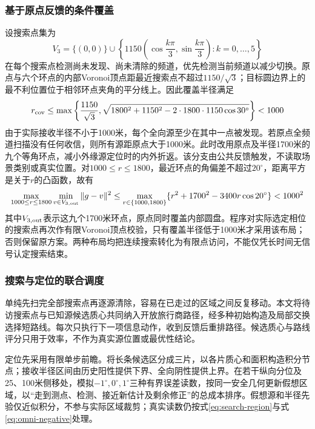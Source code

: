 \subsubsection{基于原点反馈的条件覆盖}
设搜索点集为
\begin{equation}
 V_3=\{(0,0)\}\cup\left\{1150
 \left(\cos\frac{k\pi}{3},\sin\frac{k\pi}{3}\right):k=0,\ldots,5\right\}
 \label{eq:p3-points}
\end{equation}
在每个搜索点检测尚未发现、尚未清除的频道，优先检测当前频道以减少切换。原点与六个环点的内部Voronoi顶点距最近搜索点不超过$1150/\sqrt3$；目标圆边界上的最不利位置位于相邻环点夹角的平分线上。因此覆盖半径满足
\begin{equation}
 r_{\rm cov}\le\max\left\{\frac{1150}{\sqrt3},
 \sqrt{1800^2+1150^2-2\cdot1800\cdot1150\cos30^\circ}\right\}<1000
 \label{eq:p3-cover}
\end{equation}
由于实际接收半径不小于1000米，每个全向源至少在其中一点被发现。若原点全频道扫描没有任何收信，则所有源距原点大于1000米。此时改用原点及半径1700米的九个等角环点，减小外缘源定位时的内外折返。该分支由公共反馈触发，不读取场景类别或真实位置。对$1000\le r\le1800$，最近环点的角偏差不超过$20^\circ$，距离平方是关于$r$的凸函数，故有
\begin{equation}
 \max_{1000\le r\le1800}\min_{v\in V_{3,\rm out}}\|g-v\|^2
 \le\max_{r\in\{1000,1800\}}\{r^2+1700^2-3400r\cos20^\circ\}<1000^2
 \label{eq:p3-annular}
\end{equation}
其中$V_{3,\rm out}$表示这九个1700米环点，原点同时覆盖内部圆盘。程序对实际选定相位的搜索点再次作有限Voronoi顶点校验，只有覆盖半径低于1000米才采用该布局；否则保留原方案。两种布局均把连续搜索转化为有限点访问，不能仅凭长时间无信号认定搜索结束。

\subsubsection{搜索与定位的联合调度}
单纯先扫完全部搜索点再逐源清除，容易在已走过的区域之间反复移动。本文将待访搜索点与已知源候选质心共同纳入开放旅行商路径，经多种初始构造及局部交换选择短路线。每次只执行下一项信息动作，收到反馈后重排路径。候选质心与路线评分只用于效率，不作为真实源位置或最优性结论。

定位先采用有限单步前瞻。将长条候选区分成三片，以各片质心和面积构造积分节点；接收半径区间由历史阳性提供下界、全向阴性提供上界。在若干纵向分位及25、100米侧移处，模拟$-1^\circ,0^\circ,1^\circ$三种有界误差读数，按同一安全几何更新假想区域，以“走到测点、检测、接近新估计及剩余修正”的总成本排序。假想源和半径先验仅近似积分，不参与实际区域裁剪；真实读数仍按式\eqref{eq:search-region}与式\eqref{eq:omni-negative}处理。

